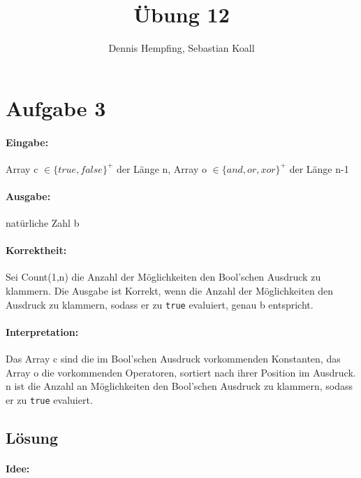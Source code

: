 \documentclass[12pt]{scrartcl}%
\theoremstyle{nonumberplain}
\newcommand{\code}[1]{\lstinline[basicstyle=\ttfamily\color{black}]{#1}}
\begin{document}
\author{Dennis Hempfing, Sebastian Koall}
\title{Übung 12}
\date{} 
\pagestyle{myheadings}

\maketitle %

\section*{Aufgabe 3}

\paragraph{Eingabe:}Array c $\in \{true, false\}^+$ der Länge n, Array o $\in \{and, or, xor\}^+$ der Länge n-1
\paragraph{Ausgabe:} natürliche Zahl b
\paragraph{Korrektheit:} Sei Count(1,n) die Anzahl der Möglichkeiten den Bool'schen Ausdruck zu klammern. Die Ausgabe ist Korrekt, wenn die Anzahl der Möglichkeiten den Ausdruck zu klammern, sodass er zu \code{true} evaluiert, genau b entspricht.
\paragraph{Interpretation:} Das Array c sind die im Bool'schen Ausdruck vorkommenden Konstanten, das Array o die vorkommenden Operatoren, sortiert nach ihrer Position im Ausdruck. n ist die Anzahl an Möglichkeiten den Bool'schen Ausdruck zu klammern, sodass er zu \code{true} evaluiert.

\subsection*{Lösung}

\paragraph{Idee:}
\end{document}
